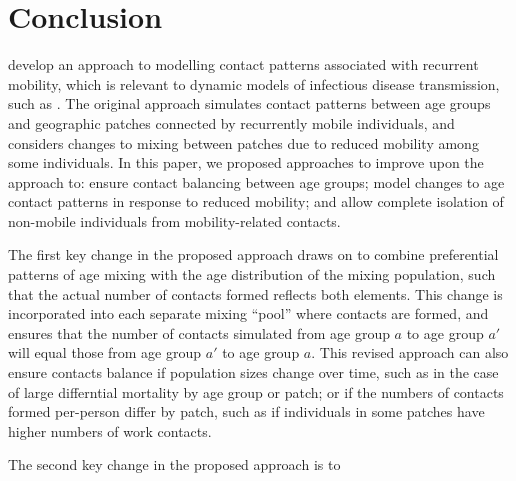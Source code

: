 \section{Conclusion}\label{conc}
\citet{Arenas2020} develop an approach to modelling
contact patterns associated with recurrent mobility,
which is relevant to dynamic models of infectious disease transmission, such as \sarscovii.
The original approach simulates contact patterns between
age groups and geographic patches connected by recurrently mobile individuals,
and considers changes to mixing between patches due to reduced mobility among some individuals.
In this paper, we proposed approaches to improve upon the approach to:
ensure contact balancing between age groups;
model changes to age contact patterns in response to reduced mobility; and
allow complete isolation of non-mobile individuals from mobility-related contacts.
\par
The first key change in the proposed approach draws on \cite{Arregui2018} to
combine preferential patterns of age mixing with the age distribution of the mixing population,
such that the actual number of contacts formed reflects both elements.
This change is incorporated into each separate mixing ``pool'' where contacts are formed,
and ensures that the number of contacts simulated from age group $a$ to age group $a'$
will equal those from age group $a'$ to age group $a$.
This revised approach can also ensure contacts balance
if population sizes change over time,
such as in the case of large differntial mortality by age group or patch;
or if the numbers of contacts formed per-person differ by patch,
such as if individuals in some patches have higher numbers of work contacts.
\par
The second key change in the proposed approach is to
